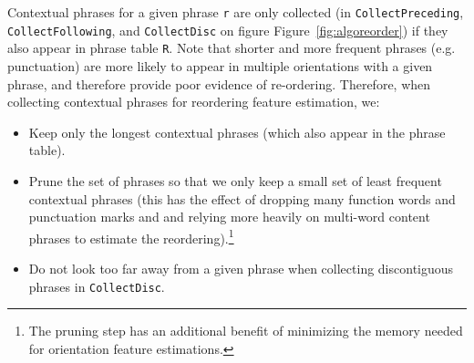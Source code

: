 \documentclass[11pt,letterpaper]{article}
\newcommand{\figref}[1]{Figure~\ref{#1}}
\newcommand{\code}[1]{{\small \tt #1}}
\newcommand{\emq}[1]{\emph{``#1''}}
\begin{document}

Contextual phrases for a given phrase \code{r} are only collected (in \code{CollectPreceding}, \code{CollectFollowing}, and \code{CollectDisc} on figure \figref{fig:algoreorder}) if they also appear in phrase table \code{R}.  Note that shorter and more frequent phrases (e.g. punctuation) are more likely to appear in multiple orientations with a given phrase, and therefore provide poor evidence of re-ordering.  Therefore, when collecting contextual phrases for reordering feature estimation, we:

\begin{itemize}
  \item Keep only the longest contextual phrases (which also appear in the phrase table).
  \item Prune the set of phrases so that we only keep a small set of least frequent contextual phrases (this has the effect of dropping many function words and punctuation marks and and relying more heavily on multi-word content phrases to estimate the reordering).\footnote{The pruning step has an additional benefit of minimizing the memory needed for orientation feature estimations.}
  \item Do not look too far away from a given phrase when collecting discontiguous phrases in \code{CollectDisc}.
\end{itemize}
\end{document}
